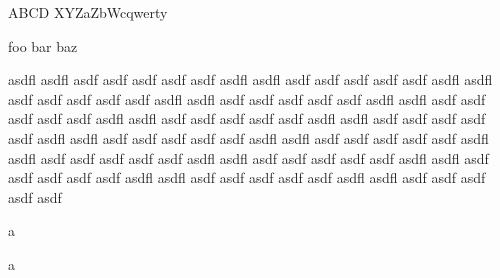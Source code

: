 \documentclass{article}
\begin{document}
\def\aaa{}
\def\yyy{Y}
\def\zzz{Z}
\def\www{W}
\def\xxx#1a#2b#3c{#1 #2 #3}
ABCD
\xxx XYZa\zzz b\www cqwerty

foo bar baz

asdfl asdfl asdf asdf asdf asdf asdf
asdfl asdfl asdf asdf asdf asdf asdf
asdfl asdfl asdf asdf asdf asdf asdf
asdfl asdfl asdf asdf asdf asdf asdf
asdfl asdfl asdf asdf asdf asdf asdf
asdfl asdfl asdf asdf asdf asdf asdf
asdfl asdfl asdf asdf asdf asdf asdf
asdfl asdfl asdf asdf asdf asdf asdf
asdfl asdfl asdf asdf asdf asdf asdf
asdfl asdfl asdf asdf asdf asdf asdf
asdfl asdfl asdf asdf asdf asdf asdf
asdfl asdfl asdf asdf asdf asdf asdf
asdfl asdfl asdf asdf asdf asdf asdf
asdfl asdfl asdf asdf asdf asdf asdf%

a

a

\end{document}
